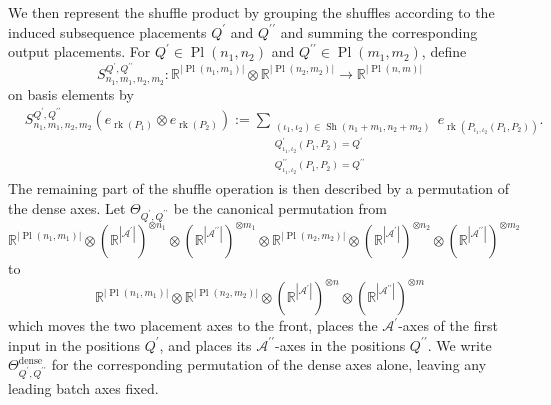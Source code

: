 \documentclass{amsart}
\theoremstyle{definition}
\theoremstyle{remark}
\begin{document}
We then represent the shuffle product by grouping the shuffles according to
the induced subsequence placements $Q^{\prime}$ and
$Q^{\prime\prime}$ and summing the corresponding output placements.
For
$Q^{\prime}\in\operatorname{Pl}(n_1,n_2)$ and
$Q^{\prime\prime}\in\operatorname{Pl}(m_1,m_2)$, define
\[
    S^{Q^{\prime},Q^{\prime\prime}}_{n_1,m_1,n_2,m_2}
    \colon
    \mathbb{R}^{|\operatorname{Pl}(n_1,m_1)|}
    \otimes
    \mathbb{R}^{|\operatorname{Pl}(n_2,m_2)|}
    \longrightarrow
    \mathbb{R}^{|\operatorname{Pl}(n,m)|}
\]
on basis elements by
\[
\begin{aligned}
    &
    S^{Q^{\prime},Q^{\prime\prime}}_{n_1,m_1,n_2,m_2}
    \left(
        e_{\operatorname{rk}(P_1)}
        \otimes
        e_{\operatorname{rk}(P_2)}
    \right) :=
    \sum_{\substack{
        (\iota_1,\iota_2)
        \in
        \operatorname{Sh}(n_1+m_1,n_2+m_2)\\
        Q^{\prime}_{\iota_1,\iota_2}(P_1,P_2)=Q^{\prime}\\
        Q^{\prime\prime}_{\iota_1,\iota_2}(P_1,P_2)=Q^{\prime\prime}
    }}
    e_{\operatorname{rk}
        \left(
            P_{\iota_1,\iota_2}(P_1,P_2)
        \right)}.
\end{aligned}
\]
The remaining part of the shuffle operation is then described by a
permutation of the dense axes. Let
$\Theta_{Q^{\prime},Q^{\prime\prime}}$ be the canonical permutation from
\[
    \mathbb{R}^{|\operatorname{Pl}(n_1,m_1)|}
    \otimes
    \left(
        \mathbb{R}^{|\mathcal{A}^{\prime}|}
    \right)^{\otimes n_1}
    \otimes
    \left(
        \mathbb{R}^{|\mathcal{A}^{\prime\prime}|}
    \right)^{\otimes m_1}
    \otimes
    \mathbb{R}^{|\operatorname{Pl}(n_2,m_2)|}
    \otimes
    \left(
        \mathbb{R}^{|\mathcal{A}^{\prime}|}
    \right)^{\otimes n_2}
    \otimes
    \left(
        \mathbb{R}^{|\mathcal{A}^{\prime\prime}|}
    \right)^{\otimes m_2}
\]
to
\[
    \mathbb{R}^{|\operatorname{Pl}(n_1,m_1)|}
    \otimes
    \mathbb{R}^{|\operatorname{Pl}(n_2,m_2)|}
    \otimes
    \left(
        \mathbb{R}^{|\mathcal{A}^{\prime}|}
    \right)^{\otimes n}
    \otimes
    \left(
        \mathbb{R}^{|\mathcal{A}^{\prime\prime}|}
    \right)^{\otimes m}
\]
which moves the two placement axes to the front, places the
$\mathcal{A}^{\prime}$-axes of the first input in the positions
$Q^{\prime}$, and places its $\mathcal{A}^{\prime\prime}$-axes in the
positions $Q^{\prime\prime}$.
We write $\Theta^{\mathrm{dense}}_{Q^{\prime},Q^{\prime\prime}}$ for the
corresponding permutation of the dense axes alone, leaving any leading batch
axes fixed.
\end{document}
